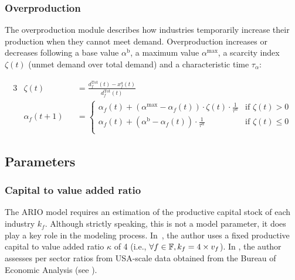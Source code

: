 \documentclass[main.tex]{subfiles}
\begin{document}
\subsubsection{Overproduction}
\label{sec:overprod_sh}

The overproduction module describes how industries temporarily increase their
production when they cannot meet demand.
Overproduction increases or decreases following a base value
$\alpha^{\textrm{b}}$, a maximum value $\alpha^{\textrm{max}}$, a scarcity
index $\zeta(t)$ (unmet demand over total demand) and a characteristic time $\tau_{\alpha}$:

\begin{alignat*}{3}
  & \zeta(t) &&= \frac{d_{f}^{\textrm{Tot}}(t) - x^{a}_f(t)}{d_{f}^{\textrm{Tot}}(t)}\\
  & \alpha_f(t+1) &&= \begin{cases}
    \alpha_f(t) + (\alpha^{\textrm{max}} - \alpha_f(t)) \cdot \zeta(t) \cdot \frac{1}{\tau^{\alpha}} & \text{if } \zeta(t) > 0\\
    \alpha_f(t) +  (\alpha^{\textrm{b}}  - \alpha_f(t)) \cdot \frac{1}{\tau^{\alpha}}                & \text{if } \zeta(t) \leq 0\\
  \end{cases}
\end{alignat*}

\subsection{Parameters}
\label{sec:parameters}

\subsubsection{Capital to value added ratio}
\label{sec:capital-to-va}

The ARIO model requires an estimation of the productive capital stock of
each industry $k_f$. Although strictly speaking, this is not a model parameter,
it does play a key role in the modeling process. In~\textcite{hallegatte-2008-adapt-region}, the
author uses a fixed productive capital to value added ratio $\kappa$ of 4 (i.e., $\forall
f \in \mathbb{F}, k_f = 4 \times v_f$). In
\textcite{hallegatte-2013-model-role}, the author assesses per sector
ratios from USA-scale data obtained from the Bureau of Economic Analysis (see
).
\end{document}
